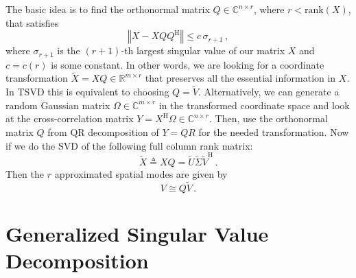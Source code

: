 \documentclass[10pt]{article}
\newcommand{\norm}[1]{\left\Vert#1\right\Vert}
\begin{document}
The basic idea is to find the orthonormal matrix $Q\in\mathbb{C}^{n\times r}$, where $r< \mathrm{rank}(X)$, that satisfies
\begin{equation}
    \norm{X- XQQ^\mathrm{H}} \le c\, \sigma_{r+1}\,,
\end{equation}
where $\sigma_{r+1}$ is the $(r+1)$-th largest singular value of our matrix $X$ and $c = c(r)$ is some constant.
In other words, we are looking for a coordinate transformation $\tilde X = X Q\in \mathbb{R}^{m\times r}$ that preserves all the essential information in $X$. 
In TSVD this is equivalent to choosing $Q=\tilde V$.
Alternatively, we can generate a random Gaussian matrix $\Omega \in \mathbb{C}^{m\times r}$ in the transformed coordinate space and look at the cross-correlation matrix %
$Y=X^\mathrm{H}\Omega \in \mathbb{C}^{n\times r}$.
Then, use the orthonormal matrix $Q$ from QR decomposition of $Y=QR$ for the needed transformation. 
Now if we do the SVD of the following full column rank matrix:
\begin{equation}
    \tilde X \triangleq X Q = \tilde U  \tilde \Sigma \tilde V^\mathrm{H}\,.
\end{equation}
Then the $r$ approximated spatial modes are given by
\begin{equation}
    {V} \cong Q \tilde V\,.
\end{equation}

\section{Generalized Singular Value Decomposition}
\end{document}
